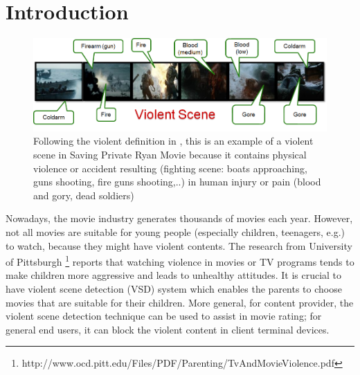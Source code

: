 \documentclass[review]{elsarticle}
\begin{document}
\linenumbers

\section{Introduction}

\begin{figure}[!b]
	\centering
	\includegraphics[width=1\linewidth]{Images/ViolentScene.png}
	\caption{Following the violent definition in \cite{demarty2014benchmarking}, this is an example of a violent scene in Saving Private Ryan Movie because it contains physical violence or accident resulting (fighting scene: boats approaching, guns shooting, fire guns shooting,..) in human injury or pain (blood and gory, dead soldiers)}
	\label{fig:exampleVS}
\end{figure}

Nowadays, the movie industry generates thousands of movies each year. However, not all movies are suitable for young people (especially children, teenagers, e.g.) to watch, because they might have violent contents.   The research from University of Pittsburgh \footnote{http://www.ocd.pitt.edu/Files/PDF/Parenting/TvAndMovieViolence.pdf} reports that watching violence in movies or TV programs tends to make children more aggressive and leads to unhealthy attitudes. It is crucial to have violent scene detection (VSD) system which enables the parents to choose movies that are suitable for their children. More general, for content provider, the violent scene detection technique can be used to assist in movie rating; for general end users, it can block the violent content in client terminal devices. 
\end{document}

